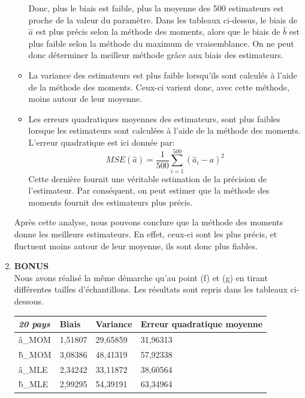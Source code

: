 \documentclass[a4paper, 11pt]{article}
\begin{document}
\begin{enumerate}[label=(\alph*)]
\begin{itemize}
        Donc, plus le biais est faible, plus la moyenne des 500 estimateurs est proche de la valeur du paramètre. Dans les tableaux ci-dessus, le biais de $\hat{a}$ est plus précis selon la méthode des moments, alors que le biais de $\hat{b}$ est plus faible selon la méthode du maximum de vraisemblance. On ne peut donc déterminer la meilleur méthode grâce aux biais des estimateurs.
        \item La variance des estimateurs est plus faible lorsqu'ils sont calculés à l'aide de la méthode des moments. Ceux-ci varient donc, avec cette méthode, moins autour de leur moyenne. 
        \item Les erreurs quadratiques moyennes des estimateurs, sont plus faibles lorsque les estimateurs sont calculées à l'aide de la méthode des moments. L'erreur quadratique est ici donnée par:
        $$MSE(\hat{a})=\frac{1}{500}\sum^{500}_{i=1} (\hat{a}_i-a)^2$$
        Cette dernière fournit une véritable estimation de la précision de l'estimateur. Par conséquent, on peut estimer que la méthode des moments fournit des estimateurs plus précis.
    \end{itemize}
    Après cette analyse, nous pouvons conclure que la méthode des moments donne les meilleurs estimateurs. En effet, ceux-ci sont les plus précis, et fluctuent moins autour de leur moyenne, ils sont donc plus fiables.
    \item \textbf{BONUS}\\
    Nous avons réalisé la même démarche qu'au point (f) et (g) en tirant différentes tailles d'échantillons. Les résultats sont repris dans les tableaux ci-dessous.
    \begin{center}
    \begin{tabular}{|p{1.5cm}||p{3.5cm}|p{3.5cm}|p{3.5cm}|}
    \hline
        \textit{20 pays} & \textbf{Biais} & \textbf{Variance} & \textbf{Erreur quadratique moyenne} \\
         \hline \hline
      \^a_{MOM} & 1,51807 & 29,65859 & 31,96313  \\
      \hline
      \^b_{MOM} & 3,08386 & 48,41319 & 57,92338 \\
      \hline
      \^a_{MLE}   & 2,34242 & 33,11872 & 38,60564 \\
      \hline
      \^b_{MLE} & 2,99295 & 54,39191 & 63,34964 \\
      \hline
    \end{tabular}
    \end{center}
    

\end{enumerate}
\end{document}
